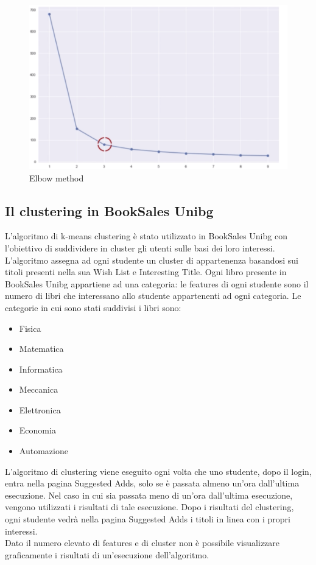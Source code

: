 \documentclass[10pt,a4paper]{report}
\begin{document}
		\begin{figure}[H]
		\centering
		\includegraphics[scale=0.5]{elbow_method.png}
		\caption{Elbow method}
		\end{figure}
	\subsection{Il clustering in BookSales Unibg}
	L'algoritmo di k-means clustering è stato utilizzato in BookSales Unibg con l'obiettivo di suddividere in cluster gli utenti sulle basi dei loro interessi.\\
	L'algoritmo assegna ad ogni studente un cluster di appartenenza basandosi sui titoli presenti nella sua Wish List e Interesting Title. Ogni libro 
	presente in BookSales Unibg appartiene ad una categoria: le features di ogni studente sono il numero di libri che interessano allo studente 
	appartenenti ad ogni categoria.
	Le categorie in cui sono stati suddivisi i libri sono:
	\begin{itemize}
		\item Fisica
		\item Matematica
		\item Informatica
		\item Meccanica
		\item Elettronica
		\item Economia
		\item Automazione
	\end{itemize}
	L'algoritmo di clustering viene eseguito ogni volta che uno studente, dopo il login, entra nella pagina Suggested Adds, solo se è passata almeno un'ora 
	dall'ultima esecuzione. Nel caso in cui sia passata meno di un'ora dall'ultima esecuzione, vengono utilizzati i risultati di tale esecuzione.
	Dopo i risultati del clustering, ogni studente vedrà nella pagina Suggested Adds i titoli in linea con i propri interessi.\\
	Dato il numero elevato di features e di cluster non è possibile visualizzare graficamente i risultati di un'esecuzione dell'algoritmo.
	
	
		
\end{document}
